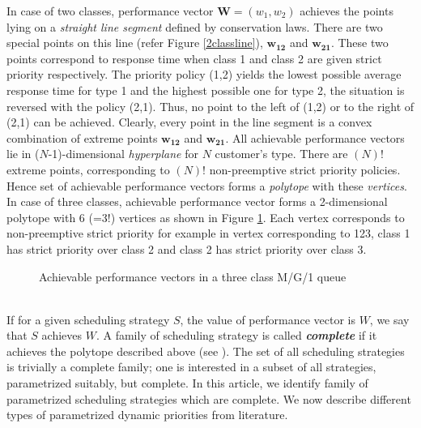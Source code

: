 \documentclass[a4paper,12pt]{article}
\begin{document}
In case of two classes, performance vector $\mathbf{W} = (w_1,w_2)$ achieves the points lying on a \textit{straight line segment} defined by conservation laws. There are two special points on this line (refer Figure \ref{2classline}), $\mathbf{w_{12}}$ and $\mathbf{w_{21}}$. These two points correspond to response time when class 1 and class 2 are given strict priority respectively. The priority policy (1,2) yields the lowest possible average response time for type 1 and the highest possible one for type 2, the situation is reversed with the policy (2,1). Thus, no point to the left of (1,2) or to the right of (2,1) can be achieved. Clearly, every point in the line segment is a convex combination of extreme points $\mathbf{w_{12}}$ and $\mathbf{w_{21}}$. All achievable performance vectors lie in ($N$-1)-dimensional \textit{hyperplane} for $N$ customer's type. There are $(N)!$ extreme points, corresponding to $(N)!$  non-preemptive strict priority policies. Hence set of achievable performance vectors forms a \textit{polytope} with these \textit{vertices}. In case of three classes, achievable performance vector forms a 2-dimensional polytope with 6 (=3!) vertices as shown in Figure \ref{3classline}. Each vertex corresponds to non-preemptive strict priority for example in vertex corresponding to 123, class 1 has strict priority over class 2 and class 2 has strict priority over class 3. 
\begin{figure}[htb!]
\centering
\resizebox{0.5 \textwidth}{!}{}
\caption{Achievable performance vectors in a three class M/G/1 queue \cite{galenbemitranibook}}
\label{3classline}
\end{figure}
\\
\indent If for a given scheduling strategy $S$, the value of performance vector is $W$, we say that $S$ achieves $W$. A family of scheduling strategy is called \textbf{\textit{complete}} if it achieves the polytope described above (see \cite{complete}). The set of all scheduling strategies is trivially a complete family; one is interested in a subset of all strategies, parametrized suitably, but complete. In this article, we identify family of parametrized scheduling strategies which are complete. We now describe different types of parametrized dynamic priorities from literature. 
\end{document}
